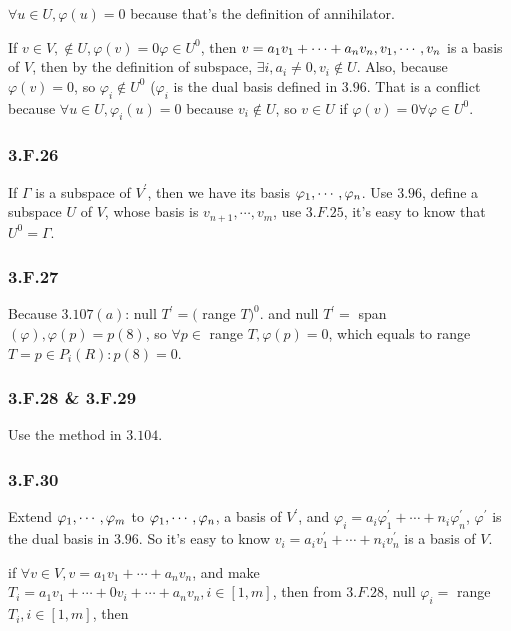 $\forall u \in U, \varphi(u) = 0$ because that's the definition of annihilator.

If $v\in V, \notin U, \varphi(v) =0 \varphi \in U^{0}$, then $v = a_{1}v_{1} + \cdots + a_{n}v_{n}, v_{1},\cdots,v_{n} $ is a basis of $V$, then by the definition of subspace, $\exists i , a_{i} \neq 0, v_{i} \notin U$. Also, because $\varphi(v) = 0$, so $\varphi_{i} \notin U^{0}$ ($\varphi_{i}$ is the dual basis defined in $3.96$. That is a conflict because $\forall u\in U, \varphi_{i}(u) = 0$ because $v_{i} \notin U$, so $v \in U$ if $\varphi(v) = 0 \forall \varphi \in U^{0}$.

\subsubsection*{3.F.26}

If $\Gamma$ is a subspace of $V^{'}$, then we have its basis $\varphi_{1},\cdots,\varphi_{n}$. Use $3.96$, define a subspace $U$ of $V$, whose basis is $v_{n+1},\cdots,v_{m}$, use $3.F.25$, it's easy to know that $U^{0} = \Gamma$.

\subsubsection*{3.F.27}

Because $3.107 (a)$: null $T^{'} = ($ range $T)^{0}$. and null $T^{'} = $ span $(\varphi), \varphi(p) = p(8)$, so $\forall p \in $ range $T, \varphi(p) = 0$, which equals to range $T = {p\in P_{i}(R): p(8) = 0}$.

\subsubsection*{3.F.28 & 3.F.29}

Use the method in $3.104$.

\subsubsection*{3.F.30}
Extend 
$\varphi_{1},\cdots,\varphi_{m}$ to $\varphi_{1},\cdots,\varphi_{n}$, 
a basis of $V^{'}$, and $\varphi_{i} = a_{i}\varphi^{'}_{1} + \cdots + n_{i}\varphi^{'}_{n}$, 
$\varphi^{'}$ is the dual basis in $3.96$. 
So it's easy to know $v_{i} = a_{i}v^{'}_{1} + \cdots + n_{i}v^{'}_{n}$ is a basis of $V$.

if $\forall v\in V, v = a_{1}v_{1} + \cdots + a_{n}v_{n}$, and make $T_{i} = a_{1}v_{1} + \cdots + 0v_{i} + \cdots + a_{n}v_{n}, i \in [1, m]$, then from $3.F.28$, null $\varphi_{i} = $ range $T_{i}, i\in [1, m]$, then

